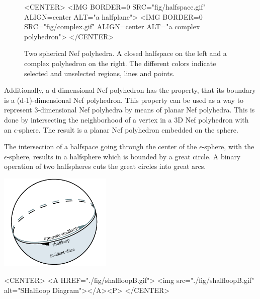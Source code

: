\begin{figure}[htbp]
\begin{ccTexOnly}
\begin{center}
\end{center}
\end{ccTexOnly}
\caption{Two spherical Nef polyhedra. A closed halfspace on the left 
  and a complex polyhedron on the right. The different colors indicate
  selected and unselected regions, lines and points.}\label{nefsexamples}
\begin{ccHtmlOnly}
<CENTER>
<IMG BORDER=0 SRC="fig/halfspace.gif" ALIGN=center
ALT="a halfplane">
<IMG BORDER=0 SRC="fig/complex.gif" ALIGN=center
ALT="a complex polyhedron">
</CENTER>
\end{ccHtmlOnly}
\end{figure}      

Additionally, a d-dimensional Nef polyhedron has the property, that its boundary
is a (d-1)-dimensional Nef polyhedron. This property can be used as a way to
represent 3-dimensional Nef polyhedra by means of planar Nef polyhedra.
This is done by intersecting the neighborhood of a vertex in a 3D Nef polyhedron
with an $\epsilon$-sphere. The result is a planar Nef polyhedron embedded
on the sphere.

The intersection of a halfspace going through the center of the $\epsilon$-sphere,
with the $\epsilon$-sphere, results in a halfsphere which is bounded by
a great circle. A binary operation of two halfspheres cuts the great circles
into great arcs.

\begin{ccTexOnly}
    \vspace{-7mm}
    \begin{center}
      \parbox{0.4\textwidth}{%
          \includegraphics[width=0.4\textwidth]{Nef_S2/fig/shalfloopB}%
      }
    \end{center}
    \vspace{-5mm}
\end{ccTexOnly}

\begin{ccHtmlOnly}
    <CENTER>
    <A HREF="./fig/shalfloopB.gif">
        <img src="./fig/shalfloopB.gif" alt="SHalfloop Diagram"></A><P>
    </CENTER>
\end{ccHtmlOnly}

